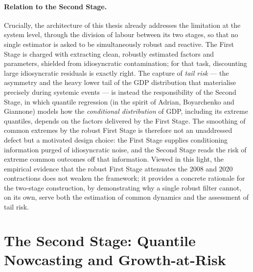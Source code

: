 \documentclass[11pt, a4paper, oneside]{article}
\begin{document}
\paragraph{Relation to the Second Stage.}
Crucially, the architecture of this thesis already addresses the
limitation at the system level, through the division of labour
between its two stages, so that no single estimator is asked to be
simultaneously robust and reactive. The First Stage is charged with
extracting clean, robustly estimated factors and parameters,
shielded from idiosyncratic contamination; for that task,
discounting large idiosyncratic residuals is exactly right. The
capture of \emph{tail risk} --- the asymmetry and the heavy lower
tail of the GDP distribution that materialise precisely during
systemic events --- is instead the responsibility of the Second
Stage, in which quantile regression (in the spirit of Adrian,
Boyarchenko and Giannone) models how the \emph{conditional
distribution} of GDP, including its extreme quantiles, depends on
the factors delivered by the First Stage. The smoothing of common
extremes by the robust First Stage is therefore not an unaddressed
defect but a motivated design choice: the First Stage supplies
conditioning information purged of idiosyncratic noise, and the
Second Stage reads the risk of extreme common outcomes off that
information. Viewed in this light, the empirical evidence that the
robust First Stage attenuates the 2008 and 2020 contractions does
not weaken the framework; it provides a concrete rationale for the
two-stage construction, by demonstrating why a single robust filter
cannot, on its own, serve both the estimation of common dynamics and
the assessment of tail risk.

\newpage

\section{The Second Stage: Quantile Nowcasting and Growth-at-Risk}
\label{sec:second-stage}
\end{document}

